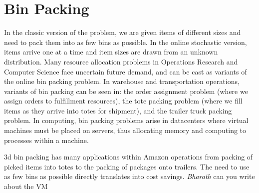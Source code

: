 \section{Bin Packing}
\label{binpacking}

In the classic version of the problem, we are given items of different sizes and need to pack them into as few bins as possible. In the online stochastic version, items arrive one at a time and item sizes are drawn from an unknown distribution. 
Many resource allocation problems in Operations Research and Computer Science face uncertain future demand, and can be cast as variants of the online bin packing problem. In warehouse and transportation operations, variants of bin packing can be seen in: the order assignment problem (where we assign orders to fulfillment resources), the tote packing problem (where we fill items as they arrive into totes for shipment), and the trailer truck packing problem. In computing, bin packing problems arise in datacenters where virtual machines must be placed on servers, thus allocating memory and computing to processes within a machine.



 
\ifx 3d bin packing has many applications within Amazon operations from packing of picked items into totes to the packing of packages onto trailers. The need to use as few bins as possible directly translates into cost savings. \emph{Bharath} can you write about the VM
\fi

